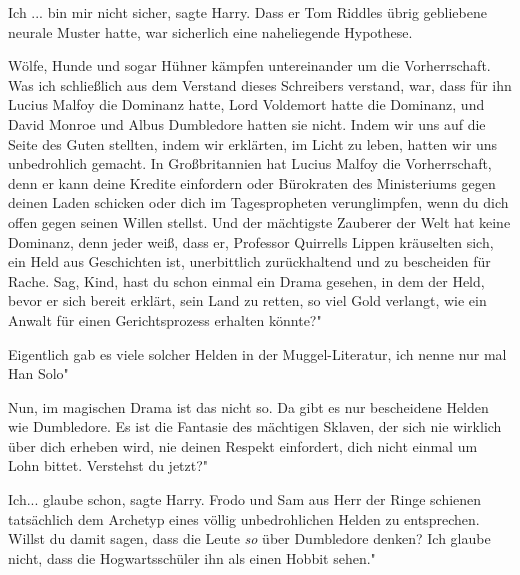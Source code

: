 \glqq{}Ich ... bin mir nicht sicher\grqq{}, sagte Harry. Dass er Tom Riddles
übrig gebliebene neurale Muster hatte, war sicherlich eine naheliegende
Hypothese.

\glqq{}Wölfe, Hunde und sogar Hühner kämpfen untereinander um die Vorherrschaft.
Was ich schließlich aus dem Verstand dieses Schreibers verstand, war, dass für
ihn Lucius Malfoy die Dominanz hatte, Lord Voldemort hatte die Dominanz, und
David Monroe und Albus Dumbledore hatten sie nicht. Indem wir uns auf die Seite
des Guten stellten, indem wir erklärten, im Licht zu leben, hatten wir uns
unbedrohlich gemacht. In Großbritannien hat Lucius Malfoy die Vorherrschaft,
denn er kann deine Kredite einfordern oder Bürokraten des Ministeriums gegen
deinen Laden schicken oder dich im Tagespropheten verunglimpfen, wenn du dich
offen gegen seinen Willen stellst. Und der mächtigste Zauberer der Welt hat
keine Dominanz, denn jeder weiß, dass er\grqq{}, Professor Quirrells Lippen
kräuselten sich, \glqq{}ein Held aus Geschichten ist, unerbittlich zurückhaltend
und zu bescheiden für Rache. Sag, Kind, hast du schon einmal ein Drama gesehen,
in dem der Held, bevor er sich bereit erklärt, sein Land zu retten, so viel Gold
verlangt, wie ein Anwalt für einen Gerichtsprozess erhalten könnte?"

\glqq{}Eigentlich gab es viele solcher Helden in der Muggel-Literatur, ich nenne
nur mal Han Solo"

\glqq{}Nun, im magischen Drama ist das nicht so. Da gibt es nur bescheidene
Helden wie Dumbledore. Es ist die Fantasie des mächtigen Sklaven, der sich nie
wirklich über dich erheben wird, nie deinen Respekt einfordert, dich nicht
einmal um Lohn bittet. Verstehst du jetzt?"

\glqq{}Ich... glaube schon\grqq{}, sagte Harry. Frodo und Sam aus Herr der Ringe
schienen tatsächlich dem Archetyp eines völlig unbedrohlichen Helden zu
entsprechen. \glqq{}Willst du damit sagen, dass die Leute \emph{so} über
Dumbledore denken? Ich glaube nicht, dass die Hogwartsschüler ihn als einen
Hobbit sehen."

